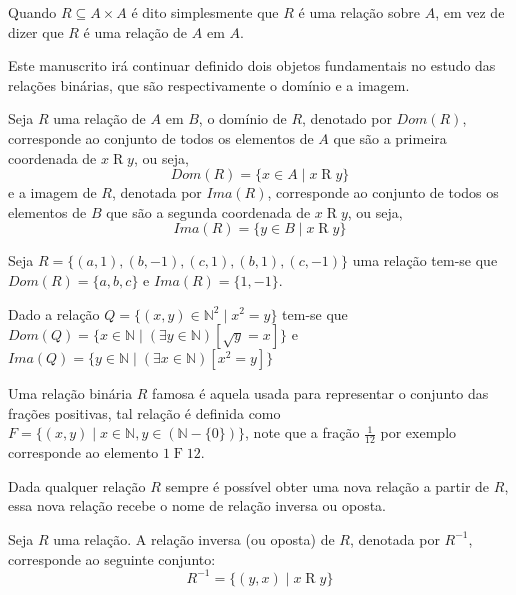 \begin{remark}
	Quando $R \subseteq A \times A$ é dito simplesmente que $R$ é uma relação sobre $A$, em vez de dizer que $R$ é uma relação de $A$ em $A$.
\end{remark}

Este manuscrito irá continuar definido dois objetos fundamentais no estudo das relações binárias, que são respectivamente o domínio e a imagem.

\begin{definition}\label{def:DominioImagemRelacoes}
	Seja $R$ uma relação de $A$ em $B$, o domínio de $R$, denotado por $Dom(R)$, corresponde ao conjunto de todos os elementos de $A$ que são a primeira coordenada de $x\mathrel{R}y$, ou seja, 
	$$Dom(R) = \{x \in A \mid x\mathrel{R}y\}$$
	e a imagem de $R$, denotada por $Ima(R)$, corresponde ao conjunto de todos os elementos de $B$ que são a segunda coordenada de $x\mathrel{R}y$, ou seja, 
	$$Ima(R) = \{y \in B \mid x\mathrel{R}y\}$$
\end{definition}

\begin{example}\label{exe:RelacaoBinaria1}
	Seja $R = \{(a, 1), (b, -1), (c, 1), (b, 1), (c, -1)\}$ uma relação tem-se que $Dom(R) = \{a, b, c\}$ e $Ima(R) = \{1, -1\}$.
\end{example}

\begin{example}
	Dado a relação $Q = \{(x, y) \in \mathbb{N}^2 \mid x^2 = y\}$ tem-se que $Dom(Q) = \{x \in \mathbb{N} \mid (\exists y \in \mathbb{N})[\sqrt{y} = x]\}$ e $Ima(Q) = \{y \in \mathbb{N} \mid (\exists x \in \mathbb{N})[x^2 = y]\}$
\end{example}

\begin{example}
	Uma relação binária $R$ famosa é aquela usada para representar o conjunto das frações positivas, tal relação é definida como $F = \{(x, y)\mid x \in \mathbb{N}, y \in (\mathbb{N}-\{0\})\}$, note que a fração $\displaystyle\frac{1}{12}$ por exemplo corresponde ao elemento $1\mathrel{F}12$.
\end{example}

Dada qualquer relação $R$ sempre é possível obter uma nova relação a partir de $R$, essa nova relação recebe o nome de relação inversa ou oposta.

\begin{definition}\label{def:RelacaoInversa}
	Seja $R$ uma relação. A relação inversa (ou oposta) de $R$, denotada por $R^{-1}$, corresponde ao seguinte conjunto:
	$$R^{-1} = \{(y,x) \mid x\mathrel{R}y\}$$
\end{definition}

